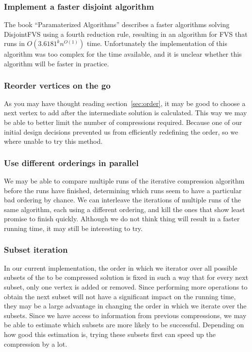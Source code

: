 \subsubsection{Implement a faster disjoint algorithm}
The book ``Paramaterized Algorithms'' \cite{ftpbook} describes a faster algorithms solving {\sc DisjointFVS} using a
fourth reduction rule, resulting in an algorithm for FVS that runs in $O(3.6181^kn^{O(1)})$ time. Unfortunately the implementation of this algorithm was too complex for the time available, and it is unclear whether this algorithm will be faster in practice.

\subsubsection{Reorder vertices on the go}
As you may have thought reading section~\ref{sec:order}, it may be good to choose a next vertex to add after the
intermediate solution is calculated. This way we may be able to better limit the number of compressions required. Because
one of our initial design decisions prevented us from efficiently redefining the order, so we where unable to try this
method.

\subsubsection{Use different orderings in parallel}
We may be able to compare multiple runs of the iterative compression algorithm before the runs have finished, determining which runs seem to have a particular bad ordering by chance. We can interleave the iterations of multiple runs of the same algorithm, each using a different ordering, and kill the ones that show least promise to finish quickly. Although we do not think thing will result in a faster running time, it may still be interesting to try.

\subsubsection{Subset iteration}
In our current implementation, the order in which we iterator over all possible subsets
of the to be compressed solution is fixed in such a way that for every next subset, only one vertex is added or removed.
Since performing more operations to obtain the next subset will not have a significant impact on the running time, they
may be a large advantage in changing the order in which we iterate over the subsets. Since we have access to information
from previous compressions, we may be able to estimate which subsets are more likely to be successful. Depending on how
good this estimation is, trying these subsets first can speed up the compression by a lot.

